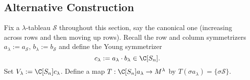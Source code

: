 \documentclass[../main.tex]{subfiles}
\begin{document}
\subsection{Alternative Construction}\label{sec:altconst}

Fix a $ \lambda $-tableau $ \mathcal{S} $ throughout this section, say the canonical one (increasing across rows and then moving up rows).
Recall the row and column symmetrizers $ a_{\lambda}:=a_{\mathcal{S}} $, $ b_{\lambda}:=b_{\mathcal{S}} $ and define the Young symmetrizer 
\[
  c_{\lambda} := a_{\lambda}\cdot b_{\lambda}\in \C[S_{n}].
\]
Set $ V_{\lambda} := \C[S_{n}]c_{\lambda} $. Define a map $ T:\C[S_{n}]a_{\lambda} \to M^{\lambda} $ by $ T(\sigma a_{\lambda})= \{\sigma \mathcal{S}\} $. 
%
%
%
%
%
\end{document}

